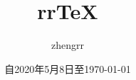 \usepackage{syntonly}



\newcommand{\rColLbl}      [1] {\fcolorbox{gray}{#1}{\color{#1}\rule{0.75em}{1ex}} {\slshape\small#1}}  %

\newcommand{\rCmd}         [1] {{\ttfamily\textbackslash#1}}                                                %
\newcommand{\rCmdO}        [2] {{\ttfamily\textbackslash#1[\textcolor{gray}{#2}]}}                          %
\newcommand{\rCmdM}        [2] {{\ttfamily\textbackslash#1\{\textcolor{gray}{#2}\}}}                        %
\newcommand{\rCmdOM}       [3] {{\ttfamily\textbackslash#1[\textcolor{gray}{#2}]\{\textcolor{gray}{#3}\}}}  %

\newcommand{\rMgnNote}     [1] {\marginpar[\scriptsize#1]{\scriptsize#1}}                 %
\newcommand{\rMgnNoteHref} [2] {\rMgnNote{\href{#1}{#2}}}                                 %
\newcommand{\rMgnNoteWref} [2] {\rMgnNoteHref{http://mathworld.wolfram.com/#1.html}{#2}}  %

\newcommand{\rTerm}        [2] {\uwave{#1}\rMgnNote{#2}}          %
\newcommand{\rTermHref}    [3] {\uwave{#1}\rMgnNoteHref{#2}{#3}}  %
\newcommand{\rTermWref}    [3] {\uwave{#1}\rMgnNoteWref{#2}{#3}}  %

\newcommand{\rPkgCite}     [1] {\textsf{#1}\cite{#1}}                                                                              %
\newcommand{\rUniNum}      [1] {\colorbox{Mulberry}{\href{https://unicode-table.com/#1/}{\color{White}\ttfamily\bfseries{}U+#1}}}  %

\providecommand{\Unicode}{\ttfamily{}Unicode\textregistered{}}  %





\title{rr\TeX}
\author{zhengrr}
\date{自2020年5月8日至\today}
\maketitle


